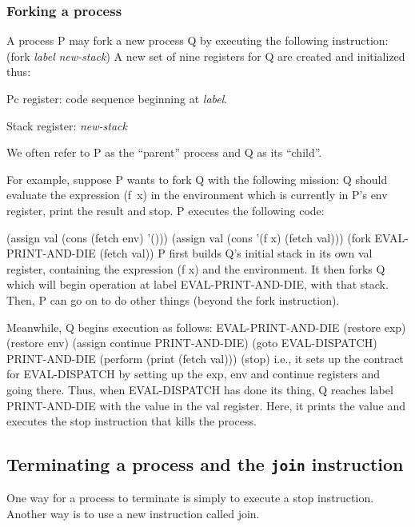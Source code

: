 \subsubsection{Forking a process}

A process P may fork a new process Q by executing the following instruction:
\beginlisp
(fork {\em label\/} {\em new-stack\/})
\endlisp
 A new set of nine registers for Q are created and initialized thus:
 \begin{tightlist}
 \item {\cf Pc} register: code sequence beginning at {\cf\em label}.

 \item {\cf Stack} register: {\em new-stack\/}
 \end{tightlist}
 We often refer to P as the ``parent'' process and Q as its ``child''.

For example, suppose P wants to fork Q with the following mission: Q
should evaluate the expression \mbox{\cf (f x)} in the environment
which is currently in P's {\cf env} register, print the result and
stop.  P executes the following code:

\beginlisp
  (assign val (cons (fetch env) '()))
  (assign val (cons '(f x) (fetch val)))
  (fork EVAL-PRINT-AND-DIE (fetch val))
\endlisp
 P first builds Q's initial stack in its own {\cf val} register,
containing the expression {\cf (f x)} and the environment.  It then
forks Q which will begin operation at label {\cf EVAL-PRINT-AND-DIE},
with that stack.  Then, P can go on to do other things (beyond the
{\cf fork} instruction).

Meanwhile, Q begins execution as follows:
\beginlisp
EVAL-PRINT-AND-DIE
  (restore exp)
  (restore env)
  (assign continue PRINT-AND-DIE)
  (goto EVAL-DISPATCH)
\null
PRINT-AND-DIE
  (perform (print (fetch val)))
  (stop)
\endlisp
i.e., it sets up the contract for {\cf EVAL-DISPATCH} by setting up
the {\cf exp}, {\cf env} and {\cf continue} registers and going there.
Thus, when {\cf EVAL-DISPATCH} has done its thing, Q reaches label
{\cf PRINT-AND-DIE} with the value in the {\cf val} register.  Here,
it prints the value and executes the {\cf stop} instruction that kills
the process.

\subsection{Terminating a process and the {\tt join} instruction}

One way for a process to terminate is simply to execute a {\cf stop}
instruction.  Another way is to use a new instruction called {\cf
join}.

